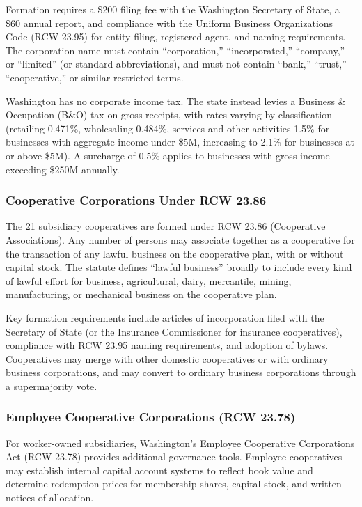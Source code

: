 \documentclass[11pt,letterpaper]{article}
\begin{document}
Formation requires a \$200 filing fee with the Washington Secretary of State, a \$60 annual report, and compliance with the Uniform Business Organizations Code (RCW 23.95) for entity filing, registered agent, and naming requirements. The corporation name must contain ``corporation,'' ``incorporated,'' ``company,'' or ``limited'' (or standard abbreviations), and must not contain ``bank,'' ``trust,'' ``cooperative,'' or similar restricted terms.

Washington has no corporate income tax. The state instead levies a Business \& Occupation (B\&O) tax on gross receipts, with rates varying by classification (retailing 0.471\%, wholesaling 0.484\%, services and other activities 1.5\% for businesses with aggregate income under \$5M, increasing to 2.1\% for businesses at or above \$5M). A surcharge of 0.5\% applies to businesses with gross income exceeding \$250M annually.

\subsubsection{Cooperative Corporations Under RCW 23.86}

The 21 subsidiary cooperatives are formed under RCW 23.86 (Cooperative Associations). Any number of persons may associate together as a cooperative for the transaction of any lawful business on the cooperative plan, with or without capital stock. The statute defines ``lawful business'' broadly to include every kind of lawful effort for business, agricultural, dairy, mercantile, mining, manufacturing, or mechanical business on the cooperative plan.

Key formation requirements include articles of incorporation filed with the Secretary of State (or the Insurance Commissioner for insurance cooperatives), compliance with RCW 23.95 naming requirements, and adoption of bylaws. Cooperatives may merge with other domestic cooperatives or with ordinary business corporations, and may convert to ordinary business corporations through a supermajority vote.

\subsubsection{Employee Cooperative Corporations (RCW 23.78)}

For worker-owned subsidiaries, Washington's Employee Cooperative Corporations Act (RCW 23.78) provides additional governance tools. Employee cooperatives may establish internal capital account systems to reflect book value and determine redemption prices for membership shares, capital stock, and written notices of allocation.
\end{document}
